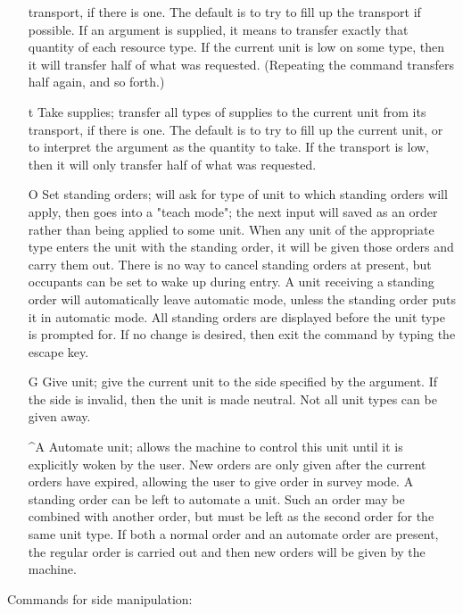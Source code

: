 \begin{itemize}
transport, if there is one.  The default is to try to fill up the transport
if possible.  If an argument is supplied, it means to transfer exactly that
quantity of each resource type.  If the current unit is low on some type,
then it will transfer half of what was requested.  (Repeating the command
transfers half again, and so forth.)
\item[{t}]
Take supplies; transfer all types of supplies to the current unit from its
transport, if there is one.  The default is to try to fill up the current
unit, or to interpret the argument as the quantity to take.  If the transport
is low, then it will only transfer half of what was requested.
\item[{O}]
Set standing orders;  will ask for type of unit to which standing orders
will apply, then goes into a "teach mode"; the next input will saved as
an order rather than being applied to some unit.
When any unit of the appropriate type enters the unit with the standing order,
it will be given those
orders and carry them out.  There is no way to cancel standing orders
at present, but occupants can be set to wake up during entry.  A unit
receiving a standing order will automatically leave automatic mode,
unless the standing order puts it in automatic mode.  All standing
orders are displayed before the unit type is prompted for.  If no
change is desired, then exit the command by typing the escape key.
\item[{G}]
Give unit;  give the current unit to the side specified by the argument.
If the side is invalid, then the unit is made neutral.  Not all unit types
can be given away.
\item[{\^{}A}]
Automate unit;  allows the machine to control this unit until it is
explicitly woken by the user.  New orders are only given after the
current orders have expired, allowing the user to give order in survey
mode.  A standing order can be left to automate a unit.  Such an order
may be combined with another order, but must be left as the second
order for the same unit type.  If both a normal order and an automate
order are present, the regular order is carried out and then new
orders will be given by the machine.
\end{itemize}\par\noindent
Commands for side manipulation:
